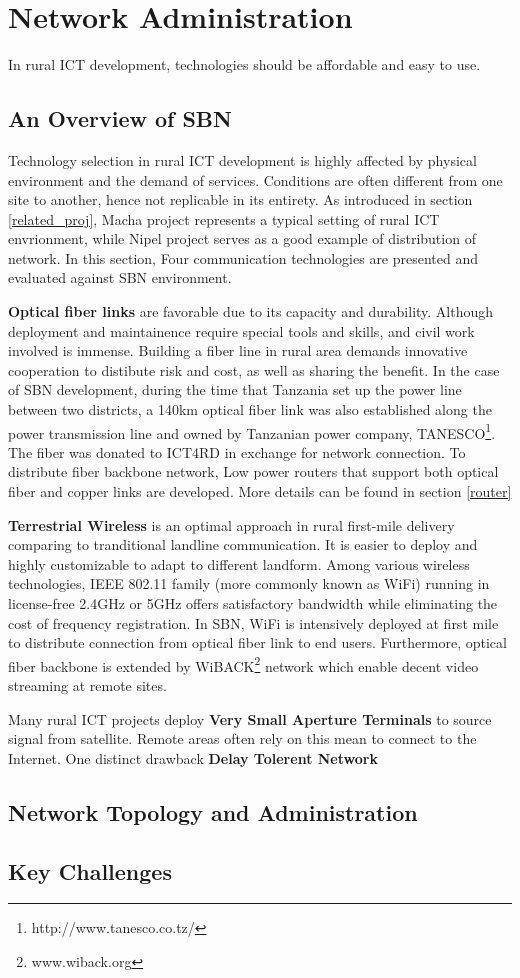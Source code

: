 \chapter{Network Administration}
In rural ICT development, technologies should be affordable and easy to use.
\section{An Overview of SBN}
Technology selection in rural ICT development is highly affected by physical environment and the demand of services. Conditions are often different from one site to another, hence not replicable in its entirety. As introduced in section \ref{related_proj}, Macha project represents a typical setting of rural ICT envrionment, while Nipel project serves as a good example of distribution of network. In this section, Four communication technologies are presented and evaluated against SBN environment.

\textbf{Optical fiber links} are favorable due to its capacity and durability. Although deployment and maintainence require special tools and skills, and civil work involved is immense. Building a fiber line in rural area demands innovative cooperation to distibute risk and cost, as well as sharing the benefit. In the case of SBN development, during the time that Tanzania set up the power line between two districts, a 140km optical fiber link was also established along the power transmission line and owned by Tanzanian power company, TANESCO\footnote{http://www.tanesco.co.tz/}. The fiber was donated to ICT4RD in exchange for network connection. To distribute fiber backbone network, Low power routers that support both optical fiber and copper links are developed. More details can be found in section \ref{router}

\textbf{Terrestrial Wireless} is an optimal approach in rural first-mile delivery comparing to tranditional landline communication. It is easier to deploy and highly customizable to adapt to different landform. Among various wireless technologies, IEEE 802.11 family (more commonly known as WiFi) running in license-free 2.4GHz or 5GHz offers satisfactory bandwidth while eliminating the cost of frequency registration. In SBN, WiFi is intensively deployed at first mile to distribute connection from optical fiber link to end users. Furthermore, optical fiber backbone is extended by WiBACK\footnote{www.wiback.org} network which enable decent video streaming at remote sites.

Many rural ICT projects deploy \textbf{Very Small Aperture Terminals} to source signal from satellite. Remote areas often rely on this mean to connect to the Internet. One distinct drawback 
\textbf{Delay Tolerent Network}

\section{Network Topology and Administration}
\section{Key Challenges}
